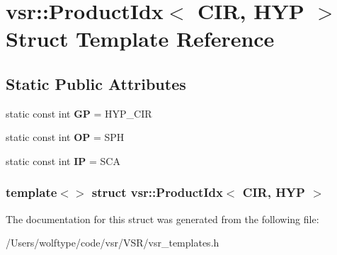 \hypertarget{structvsr_1_1_product_idx_3_01_c_i_r_00_01_h_y_p_01_4}{\section{vsr\-:\-:Product\-Idx$<$ C\-I\-R, H\-Y\-P $>$ Struct Template Reference}
\label{structvsr_1_1_product_idx_3_01_c_i_r_00_01_h_y_p_01_4}
}
\subsection*{Static Public Attributes}
\begin{DoxyCompactItemize}
\item 
\hypertarget{structvsr_1_1_product_idx_3_01_c_i_r_00_01_h_y_p_01_4_a568ed709e6d4d48d796041fcbbc27805}{static const int {\bfseries G\-P} = H\-Y\-P\-\_\-\-C\-I\-R}\label{structvsr_1_1_product_idx_3_01_c_i_r_00_01_h_y_p_01_4_a568ed709e6d4d48d796041fcbbc27805}

\item 
\hypertarget{structvsr_1_1_product_idx_3_01_c_i_r_00_01_h_y_p_01_4_a922e318f7c92ceb17ca78b109787d153}{static const int {\bfseries O\-P} = S\-P\-H}\label{structvsr_1_1_product_idx_3_01_c_i_r_00_01_h_y_p_01_4_a922e318f7c92ceb17ca78b109787d153}

\item 
\hypertarget{structvsr_1_1_product_idx_3_01_c_i_r_00_01_h_y_p_01_4_ae0f3616ce52add9b76c7d259d93132f5}{static const int {\bfseries I\-P} = S\-C\-A}\label{structvsr_1_1_product_idx_3_01_c_i_r_00_01_h_y_p_01_4_ae0f3616ce52add9b76c7d259d93132f5}

\end{DoxyCompactItemize}
\subsubsection*{template$<$$>$ struct vsr\-::\-Product\-Idx$<$ C\-I\-R, H\-Y\-P $>$}



The documentation for this struct was generated from the following file\-:\begin{DoxyCompactItemize}
\item 
/\-Users/wolftype/code/vsr/\-V\-S\-R/vsr\-\_\-templates.\-h\end{DoxyCompactItemize}
